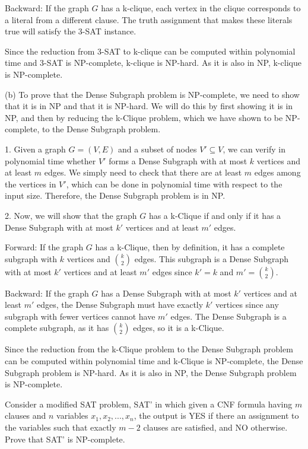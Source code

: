 \documentclass[12pt]{article}
\newenvironment{problem}[2][Problem]{\begin{trivlist}
\item[\hskip \labelsep {\bfseries #1}\hskip \labelsep {\bfseries #2.}]}{\end{trivlist}}
\begin{document}
Backward: If the graph $G$ has a k-clique, each vertex in the clique corresponds to a literal from a different clause. The truth assignment that makes these literals true will satisfy the 3-SAT instance.

Since the reduction from 3-SAT to k-clique can be computed within polynomial time and 3-SAT is NP-complete, k-clique is NP-hard. As it is also in NP, k-clique is NP-complete.

(b) To prove that the Dense Subgraph problem is NP-complete, we need to show that it is in NP and that it is NP-hard. We will do this by first showing it is in NP, and then by reducing the k-Clique problem, which we have shown to be NP-complete, to the Dense Subgraph problem.

1. Given a graph $G=(V,E)$ and a subset of nodes $V' \subseteq V$, we can verify in polynomial time whether $V'$ forms a Dense Subgraph with at most $k$ vertices and at least $m$ edges. We simply need to check that there are at least $m$ edges among the vertices in $V'$, which can be done in polynomial time with respect to the input size. Therefore, the Dense Subgraph problem is in NP.

2. Now, we will show that the graph $G$ has a k-Clique if and only if it has a Dense Subgraph with at most $k'$ vertices and at least $m'$ edges.

Forward: If the graph $G$ has a k-Clique, then by definition, it has a complete subgraph with $k$ vertices and ${k \choose 2}$ edges. This subgraph is a Dense Subgraph with at most $k'$ vertices and at least $m'$ edges since $k' = k$ and $m' = {k \choose 2}$.

Backward: If the graph $G$ has a Dense Subgraph with at most $k'$ vertices and at least $m'$ edges, the Dense Subgraph must have exactly $k'$ vertices since any subgraph with fewer vertices cannot have $m'$ edges. The Dense Subgraph is a complete subgraph, as it has ${k \choose 2}$ edges, so it is a k-Clique.

Since the reduction from the k-Clique problem to the Dense Subgraph problem can be computed within polynomial time and k-Clique is NP-complete, the Dense Subgraph problem is NP-hard. As it is also in NP, the Dense Subgraph problem is NP-complete.

\begin{problem}{3}
    Consider a modified SAT problem, SAT' in which given a CNF formula having $m$ clauses and $n$ variables $x_1,x_2,...,x_n$, the output is YES if there an assignment to the variables such that exactly $m-2$ clauses are satisfied, and NO otherwise. Prove that SAT' is NP-complete.
\end{problem}
\end{document}

